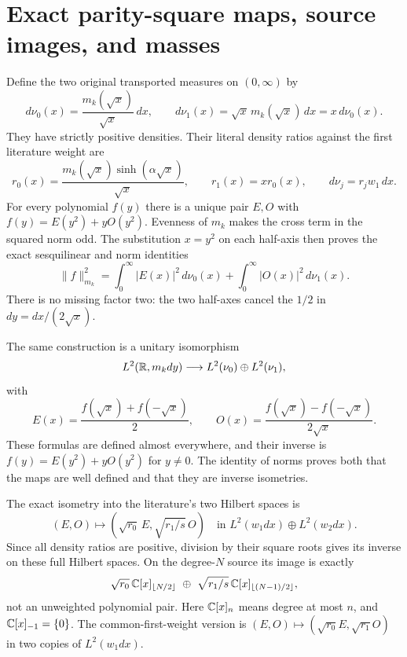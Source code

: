 \section{Exact parity-square maps, source images, and masses}

Define the two original transported measures on $(0,\infty)$ by
\begin{equation}\label{parity:eq:nu}
 d\nu_0(x)=\frac{m_k(\sqrt x)}{\sqrt x}\,dx,
 \qquad d\nu_1(x)=\sqrt x\,m_k(\sqrt x)\,dx=x\,d\nu_0(x).
\end{equation}
They have strictly positive densities. Their literal density
ratios against the first literature weight are
\begin{equation}\label{parity:eq:ratios}
 r_0(x)=\frac{m_k(\sqrt x)\sinh(\alpha\sqrt x)}{\sqrt x},
 \qquad r_1(x)=x r_0(x),\qquad d\nu_j=r_jw_1\,dx.
\end{equation}
For every polynomial $f(y)$ there is a unique pair $E,O$ with
$f(y)=E(y^2)+yO(y^2)$. Evenness of $m_k$ makes the cross term in
the squared norm odd. The substitution $x=y^2$ on each half-axis
then proves the exact sesquilinear and norm identities
\begin{equation}\label{parity:eq:parity-norm}
 \|f\|_{m_k}^2=\int_0^\infty|E(x)|^2\,d\nu_0(x)
                    +\int_0^\infty|O(x)|^2\,d\nu_1(x).
\end{equation}
There is no missing factor two: the two half-axes cancel the
$1/2$ in $dy=dx/(2\sqrt x)$.

The same construction is a unitary isomorphism
\[
 L^2(\mathbb R,m_kdy)\longrightarrow L^2(\nu_0)\oplus L^2(\nu_1),
\]
with
\[
 E(x)=\frac{f(\sqrt x)+f(-\sqrt x)}2,\qquad
 O(x)=\frac{f(\sqrt x)-f(-\sqrt x)}{2\sqrt x}.
\]
These formulas are defined almost everywhere, and their inverse
is $f(y)=E(y^2)+yO(y^2)$ for $y\ne0$. The identity of norms proves
both that the maps are well defined and that they are inverse
isometries.

The exact isometry into the literature's two Hilbert spaces is
\begin{equation}\label{parity:eq:literature-isometry}
 (E,O)\longmapsto
       \left(\sqrt{r_0}\,E,\sqrt{r_1/s}\,O\right)
 \quad\text{in }L^2(w_1dx)\oplus L^2(w_2dx).
\end{equation}
Since all density ratios are positive, division by their square
roots gives its inverse on these full Hilbert spaces. On the
degree-$N$ source its image is exactly
\[
 \sqrt{r_0}\,\parityPol_{\lfloor N/2\rfloor}
       \ \oplus\ \sqrt{r_1/s}\,\parityPol_{\lfloor(N-1)/2\rfloor},
\]
not an unweighted polynomial pair. Here $\mathbb C[x]_n$ means degree at
most $n$, and $\mathbb C[x]_{-1}=\{0\}$. The common-first-weight version
is $(E,O)\mapsto(\sqrt{r_0}E,\sqrt{r_1}O)$ in two copies of
$L^2(w_1dx)$.

